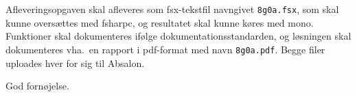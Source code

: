 \documentclass[a4paper,12pt]{article}
\begin{document}
Afleveringsopgaven skal afleveres som fsx-tekstfil navngivet \lstinline!8g0a.fsx!, som skal kunne oversættes med fsharpc, og resultatet skal kunne køres med mono. Funktioner skal dokumenteres ifølge dokumentationsstandarden, og løsningen skal dokumenteres vha.\ en rapport i pdf-format med navn \lstinline!8g0a.pdf!. Begge filer uploades hver for sig til Absalon.

\flushright God fornøjelse.
\end{document}
